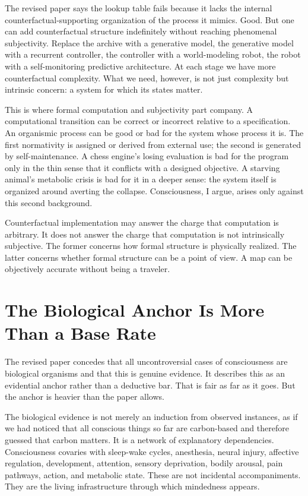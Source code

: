\documentclass[11pt]{article}
\begin{document}
The revised paper says the lookup table fails because it lacks the internal counterfactual-supporting organization of the process it mimics. Good. But one can add counterfactual structure indefinitely without reaching phenomenal subjectivity. Replace the archive with a generative model, the generative model with a recurrent controller, the controller with a world-modeling robot, the robot with a self-monitoring predictive architecture. At each stage we have more counterfactual complexity. What we need, however, is not just complexity but intrinsic concern: a system for which its states matter.

This is where formal computation and subjectivity part company. A computational transition can be correct or incorrect relative to a specification. An organismic process can be good or bad for the system whose process it is. The first normativity is assigned or derived from external use; the second is generated by self-maintenance. A chess engine's losing evaluation is bad for the program only in the thin sense that it conflicts with a designed objective. A starving animal's metabolic crisis is bad for it in a deeper sense: the system itself is organized around averting the collapse. Consciousness, I argue, arises only against this second background.

Counterfactual implementation may answer the charge that computation is arbitrary. It does not answer the charge that computation is not intrinsically subjective. The former concerns how formal structure is physically realized. The latter concerns whether formal structure can be a point of view. A map can be objectively accurate without being a traveler.

\section{The Biological Anchor Is More Than a Base Rate}

The revised paper concedes that all uncontroversial cases of consciousness are biological organisms and that this is genuine evidence. It describes this as an evidential anchor rather than a deductive bar. That is fair as far as it goes. But the anchor is heavier than the paper allows.

The biological evidence is not merely an induction from observed instances, as if we had noticed that all conscious things so far are carbon-based and therefore guessed that carbon matters. It is a network of explanatory dependencies. Consciousness covaries with sleep-wake cycles, anesthesia, neural injury, affective regulation, development, attention, sensory deprivation, bodily arousal, pain pathways, action, and metabolic state. These are not incidental accompaniments. They are the living infrastructure through which mindedness appears.
\end{document}
